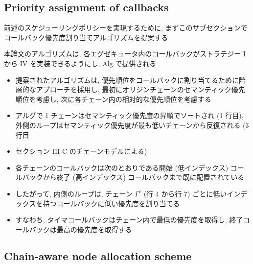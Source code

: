 \subsection{Priority assignment of callbacks}
\label{ssec: priority assignment of callbacks}

\begin{frame}{}
    前述のスケジューリングポリシーを実現するために, まずこのサブセクションでコールバック優先度割り当てアルゴリズムを提案する
    \item 本論文のアルゴリズムは, 各エグゼキュータ内のコールバックがストラテジー I から IV を実装できるようにし, Alg で提供される
\end{frame}

\begin{frame}{}
    \begin{itemize}
        \item 提案されたアルゴリズムは, 優先順位をコールバックに割り当てるために階層的なアプローチを採用し, 最初にオリジンチェーンのセマンティック優先順位を考慮し, 次に各チェーン内の相対的な優先順位を考慮する
        \item アルグで 1 チェーンはセマンティック優先度の昇順でソートされ (1 行目), 外側のループはセマンティック優先度が最も低いチェーンから反復される (3 行目
        \item セクション III-C のチェーンモデルによる)
        \item 各チェーンのコールバックは次のとおりである開始 (低インデックス) コールバックから終了 (高インデックス) コールバックまで既に配置されている
        \item したがって, 内側のループは, チェーン $\Gamma^{c}$ (行 4 から行 7) ごとに低いインデックスを持つコールバックに低い優先度を割り当てる
        \item すなわち, タイマコールバックはチェーン内で最低の優先度を取得し, 終了コールバックは最高の優先度を取得する
    \end{itemize}
\end{frame}


\subsection{Chain-aware node allocation scheme}
\label{ssec: chain-aware node allocation scheme}


